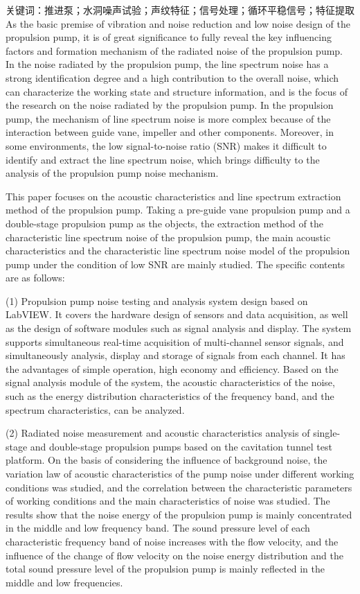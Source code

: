 关键词：推进泵；水洞噪声试验；声纹特征；信号处理；循环平稳信号；特征提取
\cleardoublepage
{}
As the basic premise of vibration and noise reduction and low noise design of the propulsion pump, 
it is of great significance to fully reveal the key influencing factors and formation mechanism of the radiated noise of the propulsion pump. 
In the noise radiated by the propulsion pump, the line spectrum noise has a strong identification degree and a high contribution to the overall noise, 
which can characterize the working state and structure information, 
and is the focus of the research on the noise radiated by the propulsion pump. 
In the propulsion pump, the mechanism of line spectrum noise is more complex because of the interaction between guide vane, impeller and other components.
Moreover, in some environments, the low signal-to-noise ratio (SNR) makes it difficult to identify and extract the line spectrum noise, 
which brings difficulty to the analysis of the propulsion pump noise mechanism.

This paper focuses on the acoustic characteristics and line spectrum extraction method of the propulsion pump. 
Taking a pre-guide vane propulsion pump and a double-stage propulsion pump as the objects, 
the extraction method of the characteristic line spectrum noise of the propulsion pump, 
the main acoustic characteristics and the characteristic line spectrum noise model of the propulsion pump under the condition of low SNR are mainly studied. 
The specific contents are as follows:

(1) Propulsion pump noise testing and analysis system design based on LabVIEW.
It covers the hardware design of sensors and data acquisition, 
as well as the design of software modules such as signal analysis and display.
The system supports simultaneous real-time acquisition of multi-channel sensor signals, 
and simultaneously analysis, display and storage of signals from each channel. 
It has the advantages of simple operation, high economy and efficiency. 
Based on the signal analysis module of the system, 
the acoustic characteristics of the noise, such as the energy distribution characteristics of the frequency band, and the spectrum characteristics, can be analyzed.

(2) Radiated noise measurement and acoustic characteristics analysis
 of single-stage and double-stage propulsion pumps based on the cavitation tunnel test platform. 
 On the basis of considering the influence of background noise, 
 the variation law of acoustic characteristics of the pump noise under different working conditions was studied, 
 and the correlation between the characteristic parameters of working conditions and the main characteristics of noise was studied. 
 The results show that the noise energy of the propulsion pump is mainly concentrated in the middle and low frequency band. 
 The sound pressure level of each characteristic frequency band of noise increases with the flow velocity, 
 and the influence of the change of flow velocity on the noise energy distribution and the total sound pressure level of the propulsion pump is mainly reflected in the middle and low frequencies.

